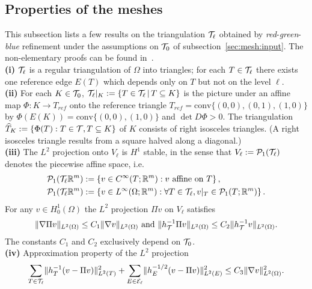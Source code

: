 \subsection{Properties of the meshes}
\label{sec:Mesh:Properties}
This subsection lists a few results on the triangulation $\mathcal{T}_\ell$ obtained by \emph{red}-\emph{green}-\emph{blue} refinement under the assumptions on $\mathcal{T}_0$ of subsection~\ref{sec:mesh:input}. The non-elementary proofs can be found in~\cite{CC2004}.\\[1.5ex]
\indent\textbf{(i) } $\mathcal{T}_\ell$ is a regular triangulation of $\Omega$ into triangles; for each $T\in\mathcal{T}_\ell $ there exists one reference edge $E(T)$ which depends only on $T$ but not on the level $\ell$.\\
\indent\textbf{(ii) } For each $K\in\mathcal{T}_0$, $\mathcal{T}_\ell|_K:=\{T\in\mathcal{T}_\ell\,|\,T\subseteq K\}$ is the picture under an affine map $\Phi: K\to T_{ref}$ onto the reference triangle $T_{ref}=\textrm{conv}\{(0,0),(0,1),(1,0)\}$ by $\Phi(E(K))=\textrm{conv}\{(0,0),(1,0)\}$ and $\det D\Phi>0$. The triangulation $\widehat{T}_K :=\{\Phi(T): T\in\mathcal{T},T\subseteq K\}$ of $K$ consists of right isosceles triangles. (A right isosceles triangle results from a square halved along a diagonal.)\\
\indent\textbf{(iii) }
The $L^2$ projection onto $V_\ell$ is $H^1$ stable, in the sense that 
$V_\ell:=\mathcal{P}_1(\mathcal{T}_\ell)$ denotes the piecewise affine space, i.e.
\begin{align*}
\mathcal{P}_1(\mathcal{T}_\ell \mathbb{R}^m) &:= \left\{ v\in C^\infty(T;\mathbb{R}^m): v\textrm{ affine on }T \right\},\\
\mathcal{P}_1(\mathcal{T}_\ell \mathbb{R}^m) &:= \left\{ v\in L^\infty(\Omega;\mathbb{R}^m): \forall T\in\mathcal{T}_\ell, v|_T\in \mathcal{P}_1(T;\mathbb{R}^m) \right\}.
\end{align*}
For any $v\in H_0^1(\Omega)$ the $L^2$ projection $\Pi v$ on $V_\ell$ satisfies
\begin{equation*}
\lVert \nabla\Pi v \rVert_{L^2(\Omega)} \leq C_1\lVert \nabla v \rVert_{L^2(\Omega)}\textrm{ and }
\lVert h^{-1}_{\mathcal{T}}\Pi v \rVert_{L^2(\Omega)} \leq C_2\lVert h^{-1}_{\mathcal{T}} v \rVert_{L^2(\Omega)}.
\end{equation*}
The constants $C_1$ and $C_2$ exclusively depend on $\mathcal{T}_0$.\\
\indent\textbf{(iv) } Approximation property of the $L^2$ projection
\begin{align*}
\sum_{T\in\mathcal{T}_\ell} \lVert h_{T}^{-1}(v-\Pi v) \rVert_{L^2(T)}^2+\sum_{E\in\mathcal{E}_\ell}\lVert h_{E}^{-1/2}(v-\Pi v) \rVert_{L^2(E)}^2 \leq C_3 \lVert \nabla v \rVert_{L^2(\Omega)}^2.
\end{align*}
